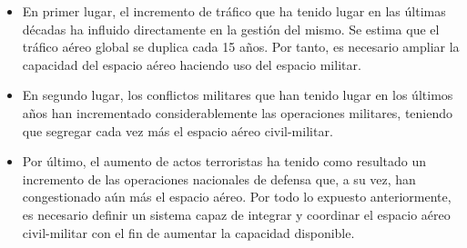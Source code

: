 \begin{itemize}
    \item En primer lugar, el incremento de tráfico que ha tenido lugar en las últimas décadas ha influido directamente en la gestión del mismo. Se estima que el tráfico aéreo global se duplica cada 15 años. Por tanto, es necesario ampliar la capacidad del espacio aéreo haciendo uso del espacio militar.
    \item En segundo lugar, los conflictos militares que han tenido lugar en los últimos años han incrementado considerablemente las operaciones militares, teniendo que segregar cada vez más el espacio aéreo civil-militar.
    \item Por último, el aumento de actos terroristas ha tenido como resultado un incremento de las operaciones nacionales de defensa que, a su vez, han congestionado aún más el espacio aéreo.
Por todo lo expuesto anteriormente, es necesario definir un sistema capaz de integrar y coordinar el espacio aéreo civil-militar con el fin de aumentar la capacidad disponible.
\end{itemize}